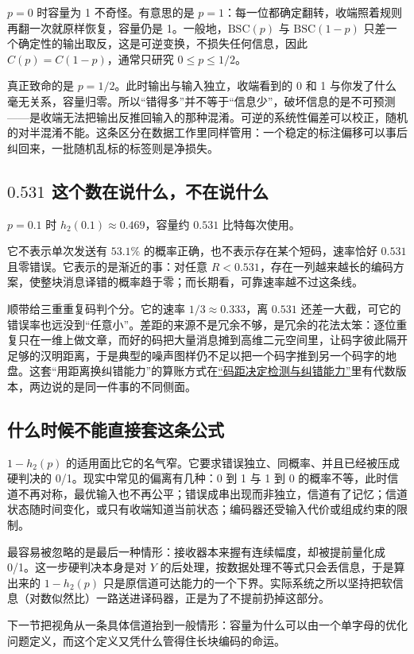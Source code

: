 \(p=0\) 时容量为 1 不奇怪。有意思的是 \(p=1\)：每一位都确定翻转，收端照着规则再翻一次就原样恢复，容量仍是 1。一般地，\(\mathrm{BSC}(p)\) 与 \(\mathrm{BSC}(1-p)\) 只差一个确定性的输出取反，这是可逆变换，不损失任何信息，因此 \(C(p)=C(1-p)\)，通常只研究 \(0\le p\le1/2\)。

真正致命的是 \(p=1/2\)。此时输出与输入独立，收端看到的 0 和 1 与你发了什么毫无关系，容量归零。所以``错得多''并不等于``信息少''，破坏信息的是不可预测——是收端无法把输出反推回输入的那种混淆。可逆的系统性偏差可以校正，随机的对半混淆不能。这条区分在数据工作里同样管用：一个稳定的标注偏移可以事后纠回来，一批随机乱标的标签则是净损失。

\subsection{\texorpdfstring{\(0.531\) 这个数在说什么，不在说什么}{0.531 这个数在说什么}}

\(p=0.1\) 时 \(h_2(0.1)\approx0.469\)，容量约 \(0.531\) 比特每次使用。

它不表示单次发送有 \(53.1\%\) 的概率正确，也不表示存在某个短码，速率恰好 \(0.531\) 且零错误。它表示的是渐近的事：对任意 \(R<0.531\)，存在一列越来越长的编码方案，使整块消息译错的概率趋于零；而长期看，可靠速率越不过这条线。

顺带给三重重复码判个分。它的速率 \(1/3\approx0.333\)，离 \(0.531\) 还差一大截，可它的错误率也远没到``任意小''。差距的来源不是冗余不够，是冗余的花法太笨：逐位重复只在一维上做文章，而好的码把大量消息摊到高维二元空间里，让码字彼此隔开足够的汉明距离，于是典型的噪声图样仍不足以把一个码字推到另一个码字的地盘。这套``用距离换纠错能力''的算账方式在\hyperref[sec:04-Discrete-Mathematics/05-Coding-and-Polynomial-Methods/02]{``码距决定检测与纠错能力''}里有代数版本，两边说的是同一件事的不同侧面。

\subsection{什么时候不能直接套这条公式}

\(1-h_2(p)\) 的适用面比它的名气窄。它要求错误独立、同概率、并且已经被压成硬判决的 0/1。现实中常见的偏离有几种：0 到 1 与 1 到 0 的概率不等，此时信道不再对称，最优输入也不再公平；错误成串出现而非独立，信道有了记忆；信道状态随时间变化，或只有收端知道当前状态；编码器还受输入代价或组成约束的限制。

最容易被忽略的是最后一种情形：接收器本来握有连续幅度，却被提前量化成 0/1。这一步硬判决本身是对 \(Y\) 的后处理，按数据处理不等式只会丢信息，于是算出来的 \(1-h_2(p)\) 只是原信道可达能力的一个下界。实际系统之所以坚持把软信息（对数似然比）一路送进译码器，正是为了不提前扔掉这部分。

下一节把视角从一条具体信道抬到一般情形：容量为什么可以由一个单字母的优化问题定义，而这个定义又凭什么管得住长块编码的命运。
